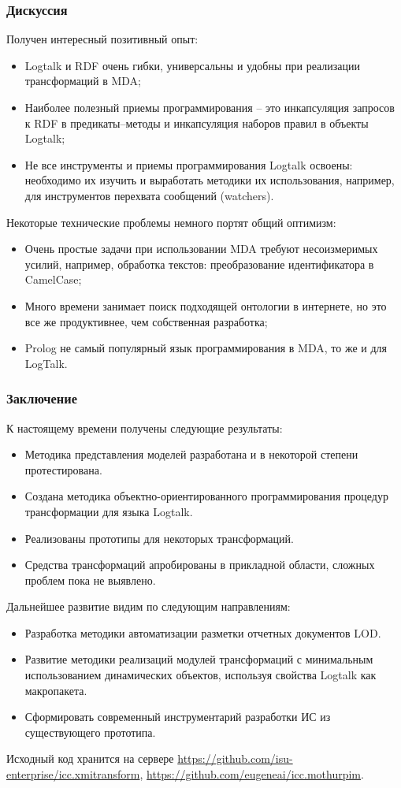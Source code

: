 \documentclass[10pt]{beamer}
\begin{document}
\begin{frame} \frametitle{Дискуссия} Получен интересный позитивный опыт: \begin{itemize} \item Logtalk и RDF очень гибки, универсальны и удобны при реализации трансформаций в MDA; \item Наиболее полезный приемы программирования -- это инкапсуляция запросов к RDF в предикаты--методы и инкапсуляция наборов правил в объекты Logtalk; \item Не все инструменты и приемы программирования Logtalk освоены: необходимо их изучить и выработать методики их использования, например, для инструментов перехвата сообщений (watchers). \end{itemize} Некоторые технические проблемы немного портят общий оптимизм: \begin{itemize} \item Очень простые задачи при использовании MDA требуют несоизмеримых усилий, например, обработка текстов: преобразование идентификатора в CamelCase; \item Много времени занимает поиск подходящей онтологии в интернете, но это все же продуктивнее, чем собственная разработка; \item Prolog не самый популярный язык программирования в MDA, то же и для LogTalk. \end{itemize} \end{frame}

\begin{frame} \frametitle{Заключение} К настоящему времени получены следующие результаты: \begin{itemize} \item Методика представления моделей разработана и в некоторой степени протестирована. \item Создана методика объектно-ориентированного программирования процедур трансформации для языка Logtalk. \item Реализованы прототипы для некоторых трансформаций. \item Средства трансформаций апробированы в прикладной области, сложных проблем пока не выявлено. \end{itemize} Дальнейшее развитие видим по следующим направлениям: \begin{itemize} \item Разработка методики автоматизации разметки отчетных документов LOD. \item Развитие методики реализаций модулей трансформаций с минимальным использованием динамических объектов, используя свойства Logtalk как макропакета. \item Сформировать современный инструментарий разработки ИС из существующего прототипа. \end{itemize}
 Исходный код хранится на сервере \url{https://github.com/isu-enterprise/icc.xmitransform}, \url{https://github.com/eugeneai/icc.mothurpim}.
\end{frame}
\end{document}
